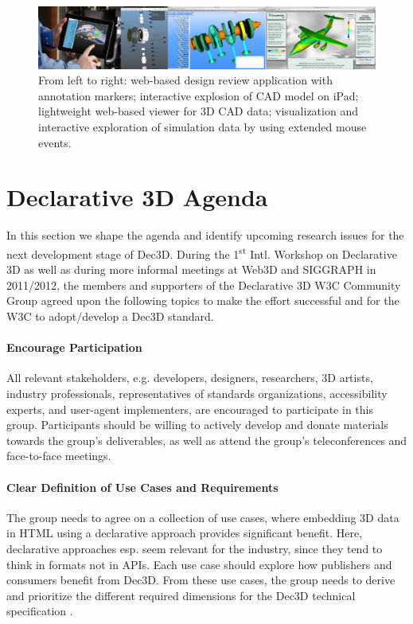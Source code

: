 \documentclass{acmsiggraph}
\begin{document}
\begin{figure}
  \centering
  \includegraphics[width=1.0\textwidth]{images/cad_apps.png}
  \caption{From left to right: web-based design review application with annotation markers; interactive explosion of CAD model on iPad; lightweight web-based viewer for 3D CAD data; visualization and interactive exploration of simulation data by using extended mouse events.}
  \label{fig:cadApps}
\end{figure}




\section{Declarative 3D Agenda}
\label{sec:Agenda}

In this section we shape the agenda and identify upcoming research issues for the next development stage of Dec3D.
During the 1\textsuperscript{st} Intl. Workshop on Declarative 3D \cite{Dec3D2012} as well as during more informal meetings at Web3D and SIGGRAPH in 2011/2012, the members and supporters of the Declarative 3D W3C Community Group agreed upon the following topics to make the effort successful and for the W3C to adopt/develop a Dec3D standard.

\paragraph{Encourage Participation}
All relevant stakeholders, e.g. developers, designers, researchers, 3D artists, industry professionals, representatives of standards organizations, accessibility experts, and user-agent implementers, are encouraged to participate in this group. Participants should be willing to actively develop and donate materials towards the group's deliverables, as well as attend the group's teleconferences and face-to-face meetings.

\paragraph{Clear Definition of Use Cases and Requirements}
The group needs to agree on a collection of use cases, where embedding 3D data in HTML using a declarative approach provides significant benefit. Here, declarative approaches esp. seem relevant for the industry, since they tend to think in formats not in APIs.
Each use case should explore how publishers and consumers benefit from Dec3D. From these use cases, the group needs to derive and prioritize the different required dimensions for the Dec3D technical specification \cite{JankowskiDec3D2012,LeFeuvreDec3D2012}.
\end{document}
